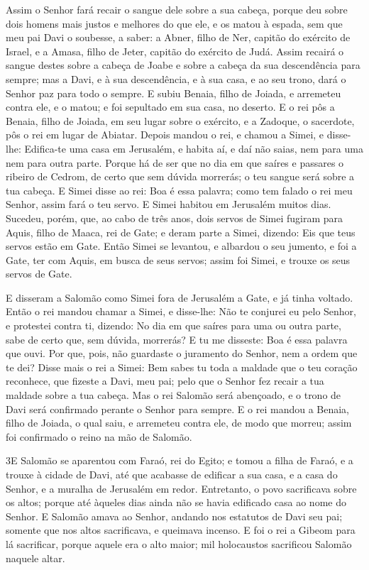 Assim o Senhor fará recair o sangue dele sobre a sua cabeça,
porque deu sobre dois homens mais justos e melhores do que ele, e os
matou à espada, sem que meu pai Davi o soubesse, a saber: a Abner,
filho de Ner, capitão do exército de Israel, e a Amasa, filho de
Jeter, capitão do exército de Judá. Assim recairá o sangue
destes sobre a cabeça de Joabe e sobre a cabeça da sua descendência
para sempre; mas a Davi, e à sua descendência, e à sua casa, e ao
seu trono, dará o Senhor paz para todo o sempre. E subiu
Benaia, filho de Joiada, e arremeteu contra ele, e o matou; e foi
sepultado em sua casa, no deserto. E o rei pôs a Benaia,
filho de Joiada, em seu lugar sobre o exército, e a Zadoque, o
sacerdote, pôs o rei em lugar de Abiatar. Depois mandou o
rei, e chamou a Simei, e disse-lhe: Edifica-te uma casa em
Jerusalém, e habita aí, e daí não saias, nem para uma nem para outra
parte. Porque há de ser que no dia em que saíres e passares o
ribeiro de Cedrom, de certo que sem dúvida morrerás; o teu sangue
será sobre a tua cabeça. E Simei disse ao rei: Boa é essa
palavra; como tem falado o rei meu Senhor, assim fará o teu servo. E
Simei habitou em Jerusalém muitos dias. Sucedeu, porém, que,
ao cabo de três anos, dois servos de Simei fugiram para Aquis, filho
de Maaca, rei de Gate; e deram parte a Simei, dizendo: Eis que teus
servos estão em Gate. Então Simei se levantou, e albardou o
seu jumento, e foi a Gate, ter com Aquis, em busca de seus servos;
assim foi Simei, e trouxe os seus servos de Gate.

E disseram a Salomão como Simei fora de Jerusalém a Gate, e já
tinha voltado. Então o rei mandou chamar a Simei, e
disse-lhe: Não te conjurei eu pelo Senhor, e protestei contra ti,
dizendo: No dia em que saíres para uma ou outra parte, sabe de certo
que, sem dúvida, morrerás? E tu me disseste: Boa é essa palavra que
ouvi. Por que, pois, não guardaste o juramento do Senhor, nem
a ordem que te dei? Disse mais o rei a Simei: Bem sabes tu
toda a maldade que o teu coração reconhece, que fizeste a Davi, meu
pai; pelo que o Senhor fez recair a tua maldade sobre a tua cabeça.
Mas o rei Salomão será abençoado, e o trono de Davi será
confirmado perante o Senhor para sempre. E o rei mandou a
Benaia, filho de Joiada, o qual saiu, e arremeteu contra ele, de
modo que morreu; assim foi confirmado o reino na mão de Salomão.

\medskip

\lettrine{3} E Salomão se aparentou com Faraó, rei do Egito; e
tomou a filha de Faraó, e a trouxe à cidade de Davi, até que
acabasse de edificar a sua casa, e a casa do Senhor, e a muralha de
Jerusalém em redor. Entretanto, o povo sacrificava sobre os
altos; porque até àqueles dias ainda não se havia edificado casa ao
nome do Senhor. E Salomão amava ao Senhor, andando nos estatutos
de Davi seu pai; somente que nos altos sacrificava, e queimava
incenso. E foi o rei a Gibeom para lá sacrificar, porque aquele
era o alto maior; mil holocaustos sacrificou Salomão naquele altar.

